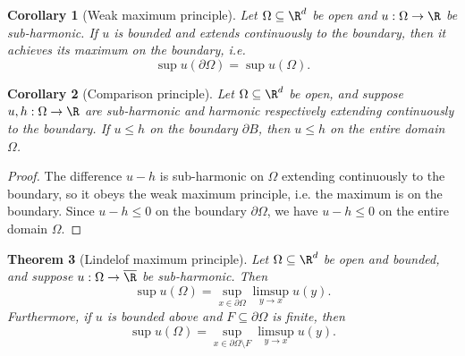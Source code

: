 \documentclass[reqno]{amsart}
\newtheorem{theorem}{Theorem}
\newtheorem{corollary}[theorem]{Corollary}
\theoremstyle{definition}
\theoremstyle{remark}
\begin{document}
\begin{corollary}[Weak maximum principle]
	Let $\Omega \subseteq \R^d$ be open and $u : \Omega \to \R$ be sub-harmonic. If $u$ is bounded and extends continuously to the boundary, then it achieves its maximum on the boundary, i.e.
		\[ \sup u (\partial \Omega) = \sup u(\Omega). \]
\end{corollary}

\begin{corollary}[Comparison principle]
	Let $\Omega \subseteq \R^d$ be open, and suppose $u, h: \Omega \to \R$ are sub-harmonic and harmonic respectively extending continuously to the boundary. If $u \leq h$ on the boundary $\partial B$, then $u \leq h$ on the entire domain $\Omega$. 	
\end{corollary}	

\begin{proof}
	The difference $u - h$ is sub-harmonic on $\Omega$ extending continuously to the boundary, so it obeys the weak maximum principle, i.e. the maximum is on the boundary. Since $u - h \leq 0$ on the boundary $\partial \Omega$, we have $u - h \leq 0$ on the entire domain $\Omega$.
\end{proof}

\begin{theorem}[Lindelof maximum principle]
	Let $\Omega \subseteq \R^d$ be open and bounded, and suppose $u : \Omega \to \overline\R$ be sub-harmonic. Then 
		\[ \sup u(\Omega) = \sup_{x \in \partial \Omega} \limsup_{y \to x} u(y). \]
	Furthermore, if $u$ is bounded above and $F \subseteq \partial\Omega$ is finite, then 
		\[ \sup u(\Omega) = \sup_{x \in \partial \Omega \setminus F} \limsup_{y \to x} u(y). \]	
\end{theorem}
\end{document}
